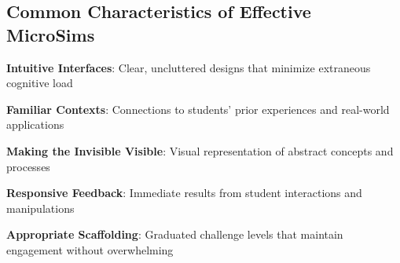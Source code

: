 
\subsection{Common Characteristics of Effective MicroSims}
\textbf{Intuitive Interfaces}: Clear, uncluttered designs that minimize extraneous cognitive load

\textbf{Familiar Contexts}: Connections to students' prior experiences and real-world applications

\textbf{Making the Invisible Visible}: Visual representation of abstract concepts and processes

\textbf{Responsive Feedback}: Immediate results from student interactions and manipulations

\textbf{Appropriate Scaffolding}: Graduated challenge levels that maintain engagement without overwhelming
